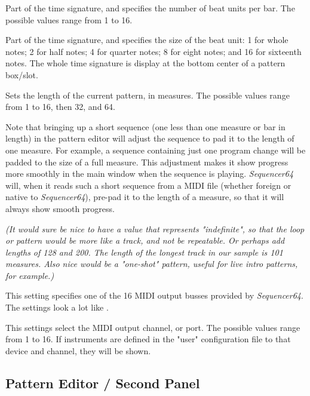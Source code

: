    Part of the time signature, and specifies the number of beat units per bar.
   The possible values range from 1 to 16.

   Part of the time signature, and specifies the size of the beat unit:
   1 for whole notes; 2 for half notes; 4 for quarter notes; 8 for eight notes;
   and 16 for sixteenth notes.
   The whole time signature is display at the bottom center of a pattern
   box/slot.

   Sets the length of the current pattern, in measures.
   The possible values range from 1 to 16, then 32, and 64.

   Note that bringing up a short sequence (one less than one measure or bar in
   length) in the pattern editor will adjust the sequence to pad it to the
   length of one measure.  For example, a sequence containing just one program
   change will be padded to the size of a full measure.
   This adjustment makes it show progress more smoothly in the main window when
   the sequence is playing.
   \textsl{Sequencer64} will, when it reads such a short sequence
   from a MIDI file (whether foreign or native to \textsl{Sequencer64}),
   pre-pad it to the length of a measure, so that it will always show smooth
   progress.

   \textsl{(It would sure be nice to have a value that represents
   "indefinite", so that the loop or pattern would be more like a track,
   and not be repeatable.  Or perhaps add lengths of 128 and 200.  The length
   of the longest track in our sample is 101 measures.
   Also nice would be a "one-shot"
   pattern, useful for live intro patterns, for example.)}

   This setting specifies one of the 16 MIDI output busses provided by
   \textsl{Sequencer64}.  The settings look a lot like
   .

   This settings select the MIDI output channel, or port.
   The possible values range from 1 to 16.
   If instruments are defined in the "user" configuration file
   to that device and channel, they will be shown.

\subsection{Pattern Editor / Second Panel}
\label{subsec:seq64_pattern_editor_second}

